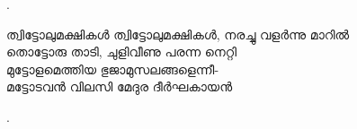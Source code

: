 \begin{enumerate}

.



\begin{slokam}{\VVt}{\VNM}{ത്വിട്ടോലുമക്ഷികള്‍}
ത്വിട്ടോലുമക്ഷികള്‍, നരച്ചു വളർന്നു മാറിൽ\\
തൊട്ടോരു താടി, ചുളിവീണു പരന്ന നെറ്റി\\
മുട്ടോളമെത്തിയ ഭുജാമുസലങ്ങളെന്നീ-\\
മട്ടോടവൻ വിലസി മേദുര ദീർഘകായൻ

\end{slokam}


.



\end{enumerate}
